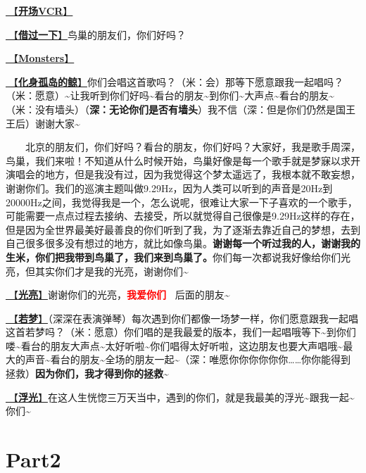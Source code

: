 \documentclass[]{ctexbook}
\begin{document}
\hyperref[opening-vcr]{🎥【\textbf{开场VCR}】}

\hyperref[I-will-go-my-way]{🎵【\textbf{借过一下}】}鸟巢的朋友们，你们好吗？

\hyperref[Monsters]{🎵【\textbf{Monsters}】}

\hyperref[hua-shen-gu-dao-de-jing]{🎵【\textbf{化身孤岛的鲸}】}你们会唱这首歌吗？（米：会）那等下愿意跟我一起唱吗？（米：愿意）\textasciitilde 让我听到你们好吗\textasciitilde 看台的朋友\textasciitilde 到你们\textasciitilde 大声点\textasciitilde 看台的朋友\textasciitilde（米：没有墙头）（\textbf{深：无论你们是否有墙头}）我不信（深：但是你们仍然是国王王后）谢谢大家\textasciitilde{}

  北京的朋友们，你们好吗？看台的朋友，你们好吗？大家好，我是歌手周深，鸟巢，我们来啦！不知道从什么时候开始，鸟巢好像是每一个歌手就是梦寐以求开演唱会的地方，但是我没有过，因为我觉得这个梦太遥远了，我根本就不敢妄想，谢谢你们。我们的巡演主题叫做9.29Hz，因为人类可以听到的声音是20Hz到20000Hz之间，我觉得我是一个，怎么说呢，很难让大家一下子喜欢的一个歌手，可能需要一点点过程去接纳、去接受，所以就觉得自己很像是9.29Hz这样的存在，但是因为全世界最美好最善良的你们听到了我，为了逐渐去靠近自己的梦想，去到自己很多很多没有想过的地方，就比如像鸟巢。\textbf{谢谢每一个听过我的人，谢谢我的生米，你们把我带到鸟巢了，我们来到鸟巢了。}你们每一次都说我好像给你们光亮，但其实你们才是我的光亮，谢谢你们\textasciitilde{}

\hyperref[silver-linings]{🎵【\textbf{光亮}】}谢谢你们的光亮，\textbf{\textcolor{red}{我爱你们~} } 后面的朋友\textasciitilde{}

\hyperref[ruomeng]{🎵【\textbf{若梦}】}（深深在表演弹琴）每次遇到你们都像一场梦一样，你们愿意跟我一起唱这首若梦吗？（米：愿意）你们唱的是我最爱的版本，我们一起唱哦等下\textasciitilde 到你们喽\textasciitilde 看台的朋友大声点\textasciitilde 太好听啦\textasciitilde 你们唱得太好听啦，这边朋友也要大声唱哦\textasciitilde 最大的声音\textasciitilde 看台的朋友\textasciitilde 全场的朋友一起\textasciitilde（深：唯愿你你你你你你\ldots\ldots 你你能得到拯救）\textbf{因为你们，我才得到你的拯救\textasciitilde{}}

\hyperref[floating-light]{🎵【\textbf{浮光}】}在这人生恍惚三万天当中，遇到的你们，就是我最美的浮光\textasciitilde 跟我一起\textasciitilde 你们\textasciitilde{}

\section{Part2}\label{beijing-20240921-part2}
\end{document}
